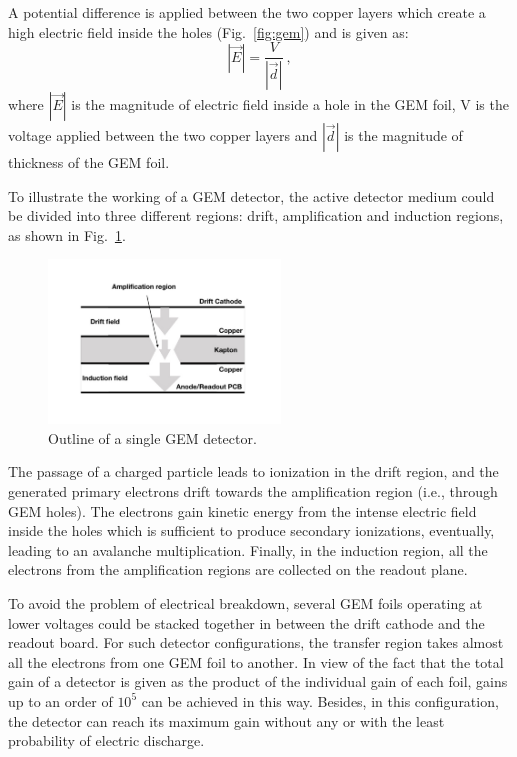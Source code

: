 A potential difference is applied between the two copper layers which create a high electric field inside the holes (Fig.~\ref{fig:gem}) and is given as:
\begin{equation}
    |\vec{E}| = \frac{V}{|\vec{d}|}~,
\end{equation}
where $|\vec{E}|$ is the magnitude of electric field inside a hole in the GEM foil, V is the voltage applied between the two copper layers and $|\vec{d}|$ is the magnitude of thickness of the GEM foil.

To illustrate the working of a GEM detector, the active detector medium could be divided into three different regions: drift, amplification and induction regions, as shown in Fig.~\ref{fig:gemOutline}.
\begin{figure}[htbp]
    \centering
    \includegraphics[width=0.55\textwidth]{figures/GEM/SingleGEM_Detector.pdf}
    \caption{Outline of a single GEM detector.}
    \label{fig:gemOutline}
\end{figure}
The passage of a charged particle leads to ionization in the drift region, and the generated primary electrons drift towards the amplification region (i.e., through GEM holes). 
The electrons gain kinetic energy from the intense electric field inside the holes which is sufficient to produce secondary ionizations, eventually, leading to an avalanche multiplication.
Finally, in the induction region, all the electrons from the amplification regions are collected on the readout plane. 

To avoid the problem of electrical breakdown, several GEM foils operating at lower voltages could be stacked together in between the drift cathode and the readout board.
For such detector configurations, the transfer region takes almost all the electrons from one GEM foil to another.
In view of the fact that the total gain of a detector is given as the product of the individual gain of each foil, gains up to an order of $10^5$ can be achieved in this way.
Besides, in this configuration, the detector can reach its maximum gain without any or with the least probability of electric discharge.

